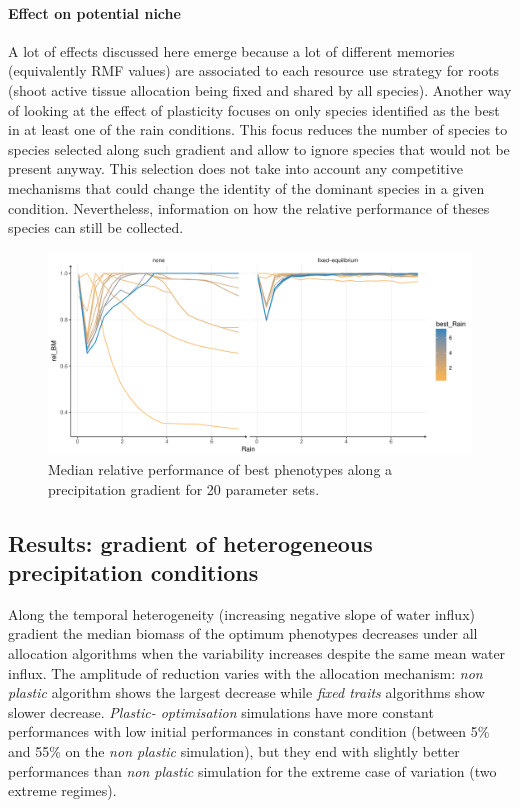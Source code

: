 \paragraph{Effect on potential niche}

A lot of effects discussed here emerge because a lot of different memories (equivalently RMF values) are associated to each resource use strategy for roots (shoot active tissue allocation being fixed and shared by all species). Another way of looking at the effect of plasticity focuses on only species identified as the best in at least one of the rain conditions. This focus reduces the number of species to species selected along such gradient and allow to ignore species that would not be present anyway. This selection does not take into account any competitive mechanisms that could change the identity of the dominant species in a given condition. Nevertheless, information on how the relative performance of theses species can still be collected.



\begin{figure}\label{fig:gradient_ranking}
\includegraphics[width = \textwidth]{./2_PP/Figures/Rain/optimum_shifting_median.pdf}
\caption{Median relative performance of best phenotypes along a precipitation gradient for 20 parameter sets.}
\end{figure}


\subsection{Results: gradient of heterogeneous precipitation conditions}

Along the temporal heterogeneity (increasing negative slope of water influx) gradient the median biomass of the optimum phenotypes decreases under all allocation algorithms when the variability increases despite the same mean water influx. The amplitude of reduction varies with the allocation mechanism: \textit{non plastic} algorithm shows the largest decrease while \textit{fixed traits} algorithms show slower decrease. \textit{Plastic- optimisation} simulations have more constant performances with low initial performances in constant condition (between 5\% and 55\% on the \textit{non plastic} simulation), but they end with slightly better performances than \textit{non plastic} simulation for the extreme case of variation (two extreme regimes).

